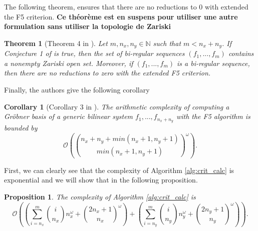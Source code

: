 \documentclass[english]{article}
\newtheorem{proposition}{Proposition}[section]
\newtheorem{theorem}{Theorem}[section]
\newtheorem{corollary}{Corollary}[section]
\begin{document}
		 The following theorem, ensures that there are no reductions to 0 with extended the F5 criterion. \textbf{Ce théorème est en suspens pour utiliser une autre formulation sans utiliser la topologie de Zariski}
		 
		 \begin{theorem}[Theorem 4 in \cite{FSS11}]
		 	Let $m, n_x, n_y \in \mathbb{N}$ such that $m < n_x + n_y$. If Conjecture 1 of \cite{FSS11} is true, then the set of bi-regular sequences $(f_1,...,f_m)$ contains a nonempty Zariski open set. Moreover, if $(f_1,...,f_m)$ is a bi-regular sequence, then there are no reductions to zero with the extended F5 criterion.
		 \end{theorem}
		 
		 Finally, the authors give the following corollary 
		 
		 \begin{corollary}[Corollary 3 in \cite{FSS11}]
		 The arithmetic complexity of computing a Gröbner basis of a generic bilinear system $f_1,...,f_{n_x + n_y}$ with the F5 algorithm is bounded by
		 $$\mathcal{O}\left(\binom{n_x + n_y + min(n_x + 1, n_y + 1)}{min(n_x + 1, n_y + 1)}^\omega\right).$$
		 \end{corollary}
		 
		 First, we can clearly see that the complexity of Algorithm \ref{alg:crit_calc} is exponential and we will show that in the following proposition.
		 
		 \begin{proposition}\label{complexCrit}
		 	The complexity of Algorithm \ref{alg:crit_calc} is
		 	$$
		 	\mathcal{O}\left(\left(\sum_{i = n_x}^{m} \binom{i}{n_x}n_x^{\omega} + \binom{2n_x + 1}{n_x}^\omega\right) + \left(\sum_{i = n_y}^{m} \binom{i}{n_y}n_y^{\omega} + \binom{2n_y + 1}{n_y}^\omega\right)\right).
		 	$$
		 \end{proposition}
		 
\end{document}
